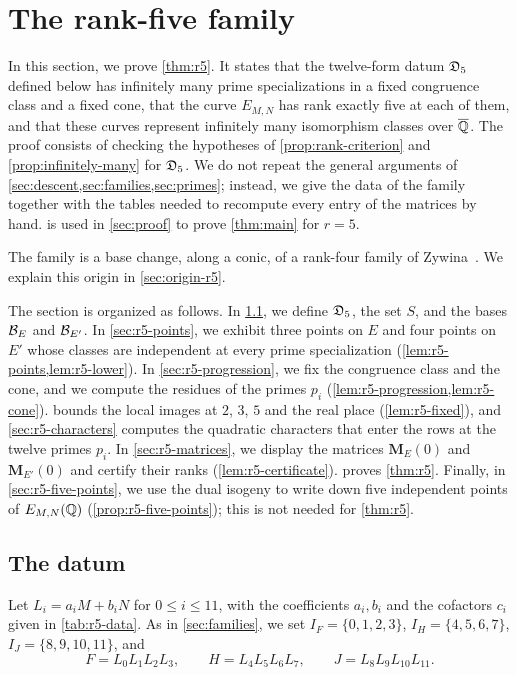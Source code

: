 \chapter{The rank-five family}\label{sec:rank5}

In this section, we prove \cref{thm:r5}. It states that the twelve-form datum $\mathfrak D_5$ defined below has infinitely many prime specializations in a fixed congruence class and a fixed cone, that the curve $E_{M,N}$ has rank exactly five at each of them, and that these curves represent infinitely many isomorphism classes over $\overline{\mathbb Q}$. The proof consists of checking the hypotheses of \cref{prop:rank-criterion} and \cref{prop:infinitely-many} for $\mathfrak D_5$. We do not repeat the general arguments of \cref{sec:descent,sec:families,sec:primes}; instead, we give the data of the family together with the tables needed to recompute every entry of the matrices by hand.  is used in \cref{sec:proof} to prove \cref{thm:main} for $r=5$.

The family is a base change, along a conic, of a rank-four family of Zywina~\cite[\S6.5]{Zywina2026}. We explain this origin in \cref{sec:origin-r5}.

The section is organized as follows. In \cref{sec:r5-datum}, we define $\mathfrak D_5$, the set $S$, and the bases $\mathcal B_E$ and $\mathcal B_{E'}$. In \cref{sec:r5-points}, we exhibit three points on $E$ and four points on $E'$ whose classes are independent at every prime specialization (\cref{lem:r5-points,lem:r5-lower}). In \cref{sec:r5-progression}, we fix the congruence class and the cone, and we compute the residues of the primes $p_i$ (\cref{lem:r5-progression,lem:r5-cone}).  bounds the local images at $2$, $3$, $5$ and the real place (\cref{lem:r5-fixed}), and \cref{sec:r5-characters} computes the quadratic characters that enter the rows at the twelve primes $p_i$. In \cref{sec:r5-matrices}, we display the matrices $\mathbf M_E(0)$ and $\mathbf M_{E'}(0)$ and certify their ranks (\cref{lem:r5-certificate}).  proves \cref{thm:r5}. Finally, in \cref{sec:r5-five-points}, we use the dual isogeny to write down five independent points of $E_{M,N}(\mathbb Q)$ (\cref{prop:r5-five-points}); this is not needed for \cref{thm:r5}.

\section{The datum}\label{sec:r5-datum}

Let $L_i=a_iM+b_iN$ for $0\le i\le 11$, with the coefficients $a_i,b_i$ and the cofactors $c_i$ given in \cref{tab:r5-data}. As in \cref{sec:families}, we set $I_F=\{0,1,2,3\}$, $I_H=\{4,5,6,7\}$, $I_J=\{8,9,10,11\}$, and
\[
F=L_0L_1L_2L_3,\qquad H=L_4L_5L_6L_7,\qquad J=L_8L_9L_{10}L_{11}.
\]

